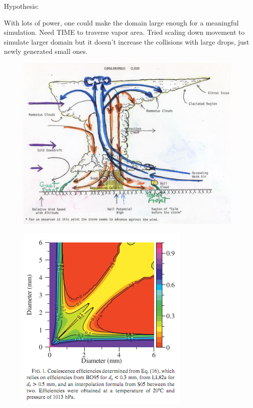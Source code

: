 \documentclass[twocolumn,a4paper,10pt]{article}
\begin{document}
Hypothesis:

With lots of power, one could make the domain large enough for a meaningful
simulation. Need TIME to traverse vapor area. Tried scaling down movement to
simulate larger domain but it doesn't increase the collisions with large
drops, just newly generated small ones.

\begin{figure}[t]
    \centering
    \includegraphics[width=\linewidth]{cloud}
    \caption{}
    \label{fig:cloud}
\end{figure}
\begin{figure}[t]
    \centering
    \includegraphics[width=0.75\linewidth]{coalesce_efficiency}
    \caption{}
    \label{fig:coalesce}
\end{figure}
\end{document}
